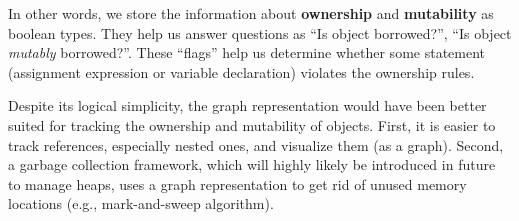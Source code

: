 In other words, we store the information about \textbf{ownership} and
\textbf{mutability} as boolean types. They help us answer questions as ``Is
object borrowed?'', ``Is object \textit{mutably} borrowed?''. These ``flags''
help us determine whether some statement (assignment expression or variable
declaration) violates the ownership rules.

Despite its logical simplicity, the graph representation would have been better
suited for tracking the ownership and mutability of objects. First, it is easier
to track references, especially nested ones, and visualize them (as a graph).
Second, a garbage collection framework, which will highly likely be introduced in future
to manage heaps, uses a graph representation to get rid of unused memory locations
(e.g., mark-and-sweep algorithm).
